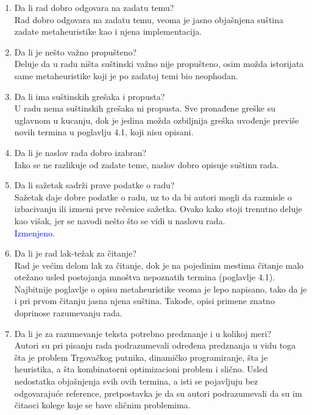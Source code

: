 \documentclass[a4paper]{report}
\newcommand{\odgovor}[1]{\textcolor{blue}{#1}}
\begin{document}
\begin{enumerate}
\item Da li rad dobro odgovara na zadatu temu?\\
Rad dobro odgovara na zadatu temu, veoma je jasno objašnjena suština zadate metaheuristike kao i njena implementacija.

\item Da li je nešto važno propušteno?\\
Deluje da u radu ništa suštinski važno nije propušteno, osim možda istorijata same metaheuristike koji je po zadatoj temi bio neophodan.

\item Da li ima suštinskih grešaka i propusta?\\
U radu nema suštinskih grešaka ni propusta. Sve pronađene greške su uglavnom u kucanju, dok je jedina možda ozbiljnija greška uvođenje previše novih termina u poglavlju 4.1, koji nisu opisani.

\item Da li je naslov rada dobro izabran?\\
Iako se ne razlikuje od zadate teme, naslov dobro opisuje suštinu rada.

\item Da li sažetak sadrži prave podatke o radu?\\
Sažetak daje dobre podatke o radu, uz to da bi autori mogli da razmisle o izbacivanju ili izmeni prve rečenice sažetka. Ovako kako stoji trenutno deluje kao višak, jer se navodi nešto što se vidi u naslovu rada.\\
\odgovor{Izmenjeno.\\} 

\item Da li je rad lak-težak za čitanje?\\
Rad je većim delom lak za čitanje, dok je na pojedinim mestima čitanje malo otežano usled postojanja mnoštva nepoznatih termina (poglavlje 4.1). Najbitnije poglavlje o opisu metaheuristike veoma je lepo napisano, tako da je i pri prvom čitanju jasna njena suština. Takođe, opisi primene znatno doprinose razumevanju rada.

\item Da li je za razumevanje teksta potrebno predznanje i u kolikoj meri?\\
Autori su pri pisanju rada podrazumevali određena predznanja u vidu toga šta je problem Trgovačkog putnika, dinamičko programiranje, šta je heuristika, a šta kombinatorni optimizacioni problem i slično. Usled nedostatka objašnjenja svih ovih termina, a isti se pojavljuju bez odgovarajuće reference, pretpostavka je da su autori podrazumevali da su im čitaoci kolege koje se bave sličnim problemima.


\end{enumerate}
\end{document}
